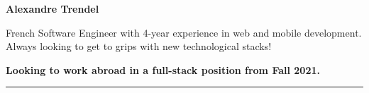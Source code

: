\documentclass{cv}
\begin{document}
\pagestyle{empty}

\noindent\begin{minipage}[c]{\textwidth}
	\large

	\textbf{\Large\color{solviolet} Alexandre Trendel}

	\smallskip

	French Software Engineer with 4-year experience in web and mobile development. Always looking to get to grips with new technological stacks!

	\smallskip

	\textbf{Looking to work abroad in a full-stack position from Fall 2021.}

	\color{solviolet}\rule{3cm}{1pt}

\end{minipage}

\vspace{1cm}
\end{document}
